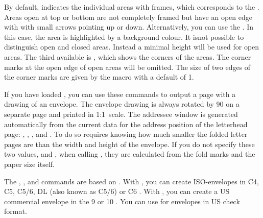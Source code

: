 \begin{Declaration}
\end{Declaration}
By default,  indicates the individual areas with
frames, which corresponds to the 
. Areas open at top or bottom are not completely framed but have
an open edge with with small arrows pointing up or down.
Alternatively, you can use the 
. In this case, the area is highlighted by a background colour.
It isnot possible to distinguish open and closed areas. Instead a minimal
height will be used for open areas. The third
available  is , which shows the corners of the
areas. The corner marks at the open edge of open areas will be omitted. The
size of two edges of the corner marks are given by the  macro
with a default of 1.%
\EndIndexGroup


\begin{Declaration}
\end{Declaration}
If you have loaded , you can use these commands to output
a page with a drawing of an envelope. The envelope drawing is always rotated
by 90\textdegree{} on a separate page and printed in 1:1~scale. The addressee
window is generated automatically from the current data for the address
position of the letterhead page: , ,
, and . To do so requires knowing how
much smaller the folded letter pages are than the width and height of the
envelope. If you do not specify these two values,  and
, when calling , they are calculated from
the fold marks and the paper size itself.

The , , and 
commands are based on . With , you
can create ISO-envelopes in C4, C5, C5/6, DL (also known as C5/6) or C6
. With , you can create a US commercial
envelope in the 9 or 10 . You can use  for
envelopes in US check format.

